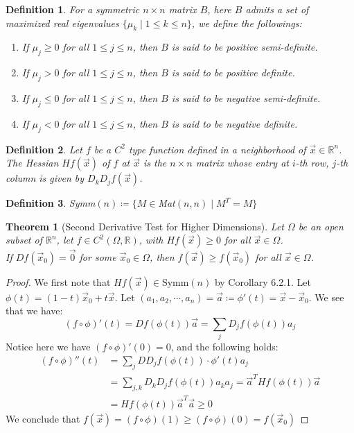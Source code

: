 \documentclass[15pt]{book}
\theoremstyle{break}
\theoremstyle{break}
\newtheorem{thm}{Theorem}[section]
\newtheorem{defn}{Definition}[corL]
\newcommand{\R}{\mathbb{R}}
\newcommand{\Symm}{\text{Symm}}
\begin{document}
\begin{defn}
For a symmetric $n\times n$ matrix $B$, here $B$ admits a set of maximized real eigenvalues $\{\mu_k\mid 1\leq k \leq n\}$, we define the followings:
\begin{enumerate}[topsep=3pt,itemsep=-1ex,partopsep=1ex,parsep=1ex]
\item If $\mu_j \geq 0$ for all $1\leq j \leq n$, then $B$ is said to be positive semi-definite.
\item If $\mu_j > 0$ for all $1\leq j \leq n$, then $B$ is said to be positive definite.
\item If $\mu_j \leq 0$ for all $1\leq j \leq n$, then $B$ is said to be negative semi-definite.
\item If $\mu_j < 0$ for all $1\leq j \leq n$, then $B$ is said to be negative definite.
\end{enumerate}
\end{defn}

\begin{defn}
Let $f$ be a $C^2$ type function defined in a neighborhood of $\vec{x}\in \R^n$. The Hessian $Hf(\vec{x})$ of $f$ at $\vec{x}$ is the $n\times n$ matrix whose entry at $i$-th row, $j$-th column is given by $D_kD_jf(\vec{x})$. 
\end{defn}

\begin{defn}
Symm$(n) \coloneqq \{ M \in $Mat$(n,n) \mid M^T = M \}$
\end{defn}

\begin{thm}[Second Derivative Test for Higher Dimensions]
Let $\Omega$ be an open subset of $\R^n$, let $f \in C^2(\Omega, \R)$, with $Hf(\vec{x})\geq 0$ for all $\vec{x}\in \Omega$. \\
If $Df(\vec{x}_0)= \vec{0}$ for some $\vec{x}_0 \in \Omega$, then $f(\vec{x}) \geq f(\vec{x}_0)$ for all $\vec{x} \in \Omega$. 
\end{thm}
\begin{proof}
We first note that $Hf(\vec{x})\in \Symm(n)$ by Corollary 6.2.1.
Let $\phi(t) = (1-t)\vec{x}_0 + t\vec{x}$. Let $(a_1,a_2,\cdots, a_n) = \vec{a}\coloneqq \phi'(t) = \vec{x}-\vec{x}_0$. We see that we have:
$$(f\circ \phi)'(t) = Df(\phi(t))\vec{a} = \sum_{j} D_jf(\phi(t))a_j$$ Notice here we have $(f\circ \phi)' (0) = 0$, and the following holds:
\begin{align*}
(f\circ \phi)''(t) 
&= \sum_{j} DD_jf(\phi(t)) \cdot \phi'(t)a_j \\
&= \sum_{j,k}D_kD_j f(\phi(t))a_ka_j = \vec{a}^T Hf(\phi(t))\vec{a} \\ &=Hf(\phi(t))\vec{a}^T \vec{a} \geq 0
\end{align*}
We conclude that $f(\vec{x})=(f\circ \phi)(1) \geq (f\circ \phi)(0)=f(\vec{x}_0)$
\end{proof}
\end{document}
